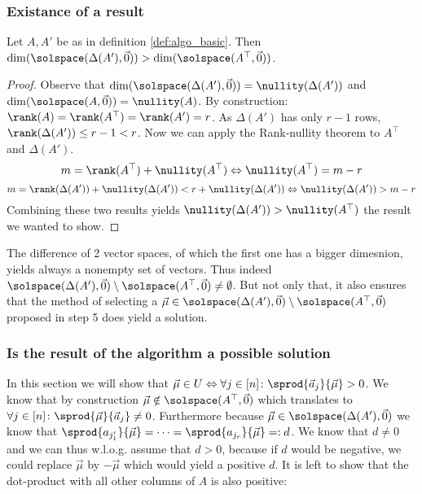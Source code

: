 \subsubsection{Existance of a result}
\begin{lemma}
    Let $A, A'$ be as in definition \ref{def:algo_basic}. Then $\dim(\solspace(\Delta(A'), \vec0)) > \dim(\solspace(A^\top, \vec0))$.
\end{lemma}
\begin{proof}
    Observe that $\dim(\solspace(\Delta(A'), \vec0)) = \nullity(\Delta(A'))$ and $\dim(\solspace(A, \vec0)) = \nullity(A)$. By construction: $\rank(A) = \rank(A^\top) = \rank(A') = r$. As $\Delta(A')$ has only $r-1$ rows, $\rank(\Delta(A')) \leq r-1 < r$. Now we can apply the Rank-nullity theorem to $A^\top$ and $\Delta(A')$.
    $$m = \rank(A^\top) + \nullity(A^\top) \Leftrightarrow \nullity(A^\top) = m - r$$
    $$m = \rank(\Delta(A')) + \nullity(\Delta(A')) < r + \nullity(\Delta(A'))\Leftrightarrow \nullity(\Delta(A')) > m - r$$
    Combining these two results yields $\nullity(\Delta(A')) > \nullity(A^\top)$ the result we wanted to show.
\end{proof}
The difference of 2 vector spaces, of which the first one has a bigger dimesnion, yields always a nonempty set of vectors. Thus indeed $\solspace(\Delta(A'), \vec0) \setminus \solspace(A^\top, \vec0) \neq \emptyset$. But not only that, it also ensures that the method of selecting a $\vec\mu \in \solspace(\Delta(A'), \vec0) \setminus \solspace(A^\top, \vec0)$ proposed in step 5 does yield a solution.

\subsubsection{Is the result of the algorithm a possible solution}
In this section we will show that $\vec\mu \in U \Leftrightarrow \forall j \in [n]\colon \sprod{\vec a_j}{\vec\mu}>0$. We know that by construction $\vec\mu \notin \solspace(A^\top, \vec0)$ which translates to $\forall j \in [n]\colon\sprod{\vec\mu}{\vec a_j} \neq 0$. Furthermore because $\vec\mu\in\solspace(\Delta(A'), \vec0)$ we know that $\sprod{a_{j'_1}}{\vec\mu} = \dots = \sprod{a_{j_r}}{\vec\mu} =: d$. We know that $d \neq 0$ and we can thus w.l.o.g. assume that $d>0$, because if $d$ would be negative, we could replace $\vec\mu$ by $-\vec\mu$ which would yield a positive $d$. It is left to show that the dot-product with all other columns of $A$ is also positive:

